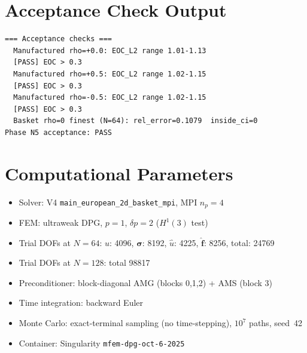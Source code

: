 \documentclass[11pt,a4paper]{article}
\begin{document}
\appendix

\section{Acceptance Check Output}
\label{app:checks}

\begin{verbatim}
=== Acceptance checks ===
  Manufactured rho=+0.0: EOC_L2 range 1.01-1.13
  [PASS] EOC > 0.3
  Manufactured rho=+0.5: EOC_L2 range 1.02-1.15
  [PASS] EOC > 0.3
  Manufactured rho=-0.5: EOC_L2 range 1.02-1.15
  [PASS] EOC > 0.3
  Basket rho=0 finest (N=64): rel_error=0.1079  inside_ci=0
Phase N5 acceptance: PASS
\end{verbatim}

\section{Computational Parameters}
\label{app:params}

\begin{itemize}
  \item Solver: V4 \texttt{main\_european\_2d\_basket\_mpi}, MPI $n_p=4$
  \item FEM: ultraweak DPG, $p=1$, $\delta p=2$ ($H^1(3)$ test)
  \item Trial DOFs at $N=64$: $u$: 4096, $\boldsymbol{\sigma}$: 8192,
        $\hat{u}$: 4225, $\hat{\boldsymbol{f}}$: 8256, total: 24769
  \item Trial DOFs at $N=128$: total 98817
  \item Preconditioner: block-diagonal AMG (blocks 0,1,2) + AMS (block 3)
  \item Time integration: backward Euler
  \item Monte Carlo: exact-terminal sampling (no time-stepping),
        $10^7$ paths, seed~42
  \item Container: Singularity \texttt{mfem-dpg-oct-6-2025}
\end{itemize}
\end{document}
